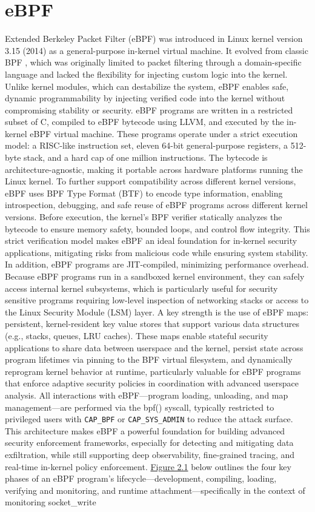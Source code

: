 \documentclass [11pt, proquest] {uwthesis}[2020/02/24]
\begin{document}
\section{eBPF}
Extended Berkeley Packet Filter (eBPF) was introduced in Linux kernel version 3.15 (2014) as a general-purpose in-kernel virtual machine. It evolved from classic BPF \cite{10.5555/1267303.1267305}, which was originally limited to packet filtering through a domain-specific language and lacked the flexibility for injecting custom logic into the kernel. Unlike kernel modules, which can destabilize the system, eBPF enables safe, dynamic programmability by injecting verified code into the kernel without compromising stability or security. eBPF programs are written in a restricted subset of C, compiled to eBPF bytecode using LLVM, and executed by the in-kernel eBPF virtual machine. These programs operate under a strict execution model: a RISC-like instruction set, eleven 64-bit general-purpose registers, a 512-byte stack, and a hard cap of one million instructions. The bytecode is architecture-agnostic, making it portable across hardware platforms running the Linux kernel. To further support compatibility across different kernel versions, eBPF uses BPF Type Format (BTF) to encode type information, enabling introspection, debugging, and safe reuse of eBPF programs across different kernel versions. Before execution, the kernel’s BPF verifier statically analyzes the bytecode to ensure memory safety, bounded loops, and control flow integrity. This strict verification model makes eBPF an ideal foundation for in-kernel security applications, mitigating risks from malicious code while ensuring system stability. In addition, eBPF programs are JIT-compiled, minimizing performance overhead. Because eBPF programs run in a sandboxed kernel environment, they can safely access internal kernel subsystems, which is particularly useful for security sensitive programs requiring low-level inspection of networking stacks or access to the Linux Security Module (LSM) layer. A key strength is the use of eBPF maps: persistent, kernel-resident key value stores that support various data structures (e.g., stacks, queues, LRU caches). These maps enable stateful security applications to share data between userspace and the kernel, persist state across program lifetimes via pinning to the BPF virtual filesystem, and dynamically reprogram kernel behavior at runtime, particularly valuable for eBPF programs that enforce adaptive security policies in coordination with advanced userspace analysis. All interactions with eBPF—program loading, unloading, and map management—are performed via the bpf() syscall, typically restricted to privileged users with \texttt{CAP\_BPF} or \texttt{CAP\_SYS\_ADMIN} to reduce the attack surface. This architecture makes eBPF a powerful foundation for building advanced security enforcement frameworks, especially for detecting and mitigating data exfiltration, while still supporting deep observability, fine-grained tracing, and real-time in-kernel policy enforcement. \hyperref[fig:eBPF-injection]{Figure 2.1} below outlines the four key phases of an eBPF program’s lifecycle—development, compiling, loading, verifying and monitoring, and runtime attachment—specifically in the context of monitoring socket\_write 
\end{document}
